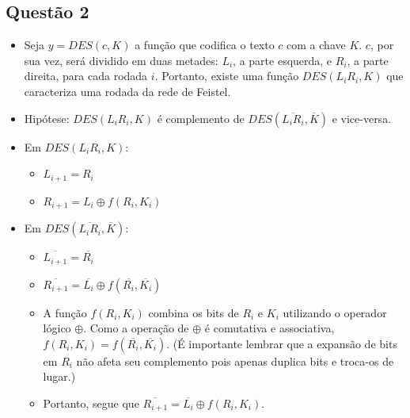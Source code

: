 \documentclass{../sftex/sftex}
\begin{document}
\subsection*{Questão 2}

\begin{itemize}

    \item Seja $y = DES(c, K)$ a função que codifica o texto $c$ com a chave
        $K$. $c$, por sua vez, será dividido em duas metades: $L_i$, a parte
        esquerda, e $R_i$, a parte direita, para cada rodada $i$. Portanto,
        existe uma função $DES(L_{i} R_{i}, K)$ que caracteriza uma rodada
        da rede de Feistel.

    \item Hipótese: $DES(L_{i} R_{i}, K)$ é complemento de
        $DES(\overline{L_{i} R_{i}}, \overline{K})$ e vice-versa.

    \item Em $DES(L_{i} R_{i}, K)$:

    \begin{itemize}

        \item $L_{i+1} = R_i$

        \item $R_{i+1} = L_i \oplus f(R_i,K_i)$

    \end{itemize}

    \item Em $DES(\overline{L_{i} R_{i}}, \overline{K})$:

    \begin{itemize}

        \item $\overline{L_{i+1}} = \overline{R_i}$

        \item $\overline{R_{i+1}}
            = \overline{L_i} \oplus f(\overline{R_i},\overline{K_i})$

        \item A função ${f(R_i,K_i)}$ combina os bits de $R_i$ e $K_i$
            utilizando o operador lógico $\oplus$. Como a operação de $\oplus$
            é comutativa e associativa, ${f(R_i,K_i)}
            = f(\overline{R_i},\overline{K_i})$. (É importante lembrar que a
            expansão de bits em $R_i$ não afeta seu complemento pois apenas
            duplica bits e troca-os de lugar.)

        \item Portanto, segue que $\overline{R_{i+1}}
            = \overline{L_i} \oplus f(R_i,K_i)$.


\end{itemize}
\end{itemize}
\end{document}
